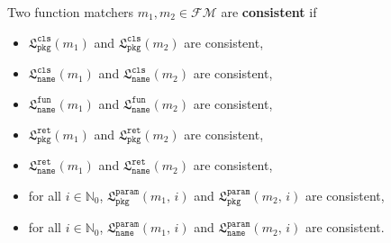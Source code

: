 \documentclass{article}
\newcommand{\lang}{\mathfrak{L}}
\begin{document}
Two function matchers $m_1, m_2 \in \mathcal{FM}$ are \textbf{consistent} if
\begin{itemize}
    \item $\lang_\texttt{pkg}^\texttt{cls}(m_1)$ and $\lang_\texttt{pkg}^\texttt{cls}(m_2)$ are consistent,
    \item $\lang_\texttt{name}^\texttt{cls}(m_1)$ and $\lang_\texttt{name}^\texttt{cls}(m_2)$ are consistent,
    \item $\lang_\texttt{name}^\texttt{fun}(m_1)$ and $\lang_\texttt{name}^\texttt{fun}(m_2)$ are consistent,
    \item $\lang_\texttt{pkg}^\texttt{ret}(m_1)$ and $\lang_\texttt{pkg}^\texttt{ret}(m_2)$ are consistent,
    \item $\lang_\texttt{name}^\texttt{ret}(m_1)$ and $\lang_\texttt{name}^\texttt{ret}(m_2)$ are consistent,
    \item for all $i \in \mathbb{N}_0$, $\lang_\texttt{pkg}^\texttt{param}(m_1,\, i)$ and $\lang_\texttt{pkg}^\texttt{param}(m_2,\, i)$ are consistent,
    \item for all $i \in \mathbb{N}_0$, $\lang_\texttt{name}^\texttt{param}(m_1,\, i)$ and $\lang_\texttt{name}^\texttt{param}(m_2,\, i)$ are consistent.
\end{itemize}
\end{document}
